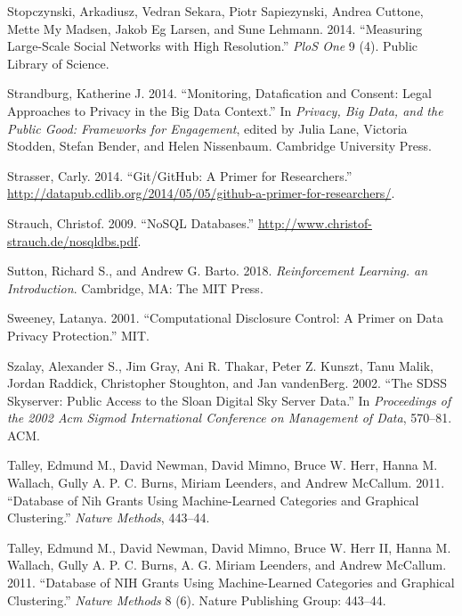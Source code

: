 \documentclass[]{krantz}
\begin{document}
\hypertarget{ref-stopczynski2014}{}
Stopczynski, Arkadiusz, Vedran Sekara, Piotr Sapiezynski, Andrea
Cuttone, Mette My Madsen, Jakob Eg Larsen, and Sune Lehmann. 2014.
``Measuring Large-Scale Social Networks with High Resolution.''
\emph{PloS One} 9 (4). Public Library of Science.

\hypertarget{ref-Strandburg2014}{}
Strandburg, Katherine J. 2014. ``Monitoring, Datafication and Consent:
Legal Approaches to Privacy in the Big Data Context.'' In \emph{Privacy,
Big Data, and the Public Good: Frameworks for Engagement}, edited by
Julia Lane, Victoria Stodden, Stefan Bender, and Helen Nissenbaum.
Cambridge University Press.

\hypertarget{ref-GitResearch}{}
Strasser, Carly. 2014. ``Git/GitHub: A Primer for Researchers.''
\url{http://datapub.cdlib.org/2014/05/05/github-a-primer-for-researchers/}.

\hypertarget{ref-NoSQLdatabases}{}
Strauch, Christof. 2009. ``NoSQL Databases.''
\url{http://www.christof-strauch.de/nosqldbs.pdf}.

\hypertarget{ref-Sutton2018}{}
Sutton, Richard S., and Andrew G. Barto. 2018. \emph{Reinforcement
Learning. an Introduction}. Cambridge, MA: The MIT Press.

\hypertarget{ref-sweeney2001computational}{}
Sweeney, Latanya. 2001. ``Computational Disclosure Control: A Primer on
Data Privacy Protection.'' MIT.

\hypertarget{ref-szalay2002sdss}{}
Szalay, Alexander S., Jim Gray, Ani R. Thakar, Peter Z. Kunszt, Tanu
Malik, Jordan Raddick, Christopher Stoughton, and Jan vandenBerg. 2002.
``The SDSS Skyserver: Public Access to the Sloan Digital Sky Server
Data.'' In \emph{Proceedings of the 2002 Acm Sigmod International
Conference on Management of Data}, 570--81. ACM.

\hypertarget{ref-EdmundMTalley2011}{}
Talley, Edmund M., David Newman, David Mimno, Bruce W. Herr, Hanna M.
Wallach, Gully A. P. C. Burns, Miriam Leenders, and Andrew McCallum.
2011. ``Database of Nih Grants Using Machine-Learned Categories and
Graphical Clustering.'' \emph{Nature Methods}, 443--44.

\hypertarget{ref-talley2011database}{}
Talley, Edmund M., David Newman, David Mimno, Bruce W. Herr II, Hanna M.
Wallach, Gully A. P. C. Burns, A. G. Miriam Leenders, and Andrew
McCallum. 2011. ``Database of NIH Grants Using Machine-Learned
Categories and Graphical Clustering.'' \emph{Nature Methods} 8 (6).
Nature Publishing Group: 443--44.
\end{document}
